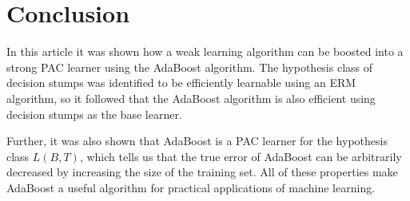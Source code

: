 \section{Conclusion}
\label{conclusion}

In this article it was shown how a weak learning algorithm can be boosted into a strong PAC learner using the
AdaBoost algorithm.
The hypothesis class of decision stumps was identified to be efficiently learnable using an ERM algorithm, so
it followed that the AdaBoost algorithm is also efficient using decision stumps as the base learner.

Further, it was also shown that AdaBoost is a PAC learner for the hypothesis class $L(B, T)$, which tells us
that the true error of AdaBoost can be arbitrarily decreased by increasing the size of the training set.
All of these properties make AdaBoost a useful algorithm for practical applications of machine learning.

